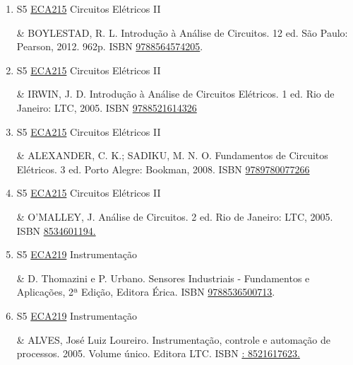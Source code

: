 \documentclass[12pt,a4paper]{book}
\begin{document}
\begin{enumerate}
 \item S5 \hyperref[PUD:ECA215]{ECA215} Circuitos Elétricos II

& BOYLESTAD, R.  L.  Introdução à Análise de Circuitos.  12 ed.  São Paulo: Pearson,
2012.  962p.  ISBN \href{http://www.bn.br/site/pages/servicosProfissionais/agenciaISBN/isbnBusca/FbnBuscaISBNCatalogo.asp?pField=ISBN&pIntPagina=1&pISBN=64574205&nidbISBN=true&hidbISBN=true}{9788564574205}.
 \item S5 \hyperref[PUD:ECA215]{ECA215} Circuitos Elétricos II

& IRWIN, J.  D.  Introdução à Análise de Circuitos Elétricos.  1 ed.  Rio de 
Janeiro: LTC, 2005.  ISBN \href{http://www.bn.br/site/pages/servicosProfissionais/agenciaISBN/isbnBusca/FbnBuscaISBNCatalogo.asp?pField=ISBN&pIntPagina=1&pISBN=21614326&nidbISBN=true&hidbISBN=true}{9788521614326} 
 

 \item S5 \hyperref[PUD:ECA215]{ECA215} Circuitos Elétricos II

& ALEXANDER, C.  K.;  SADIKU, M.  N.  O.  Fundamentos de Circuitos Elétricos.  
3 ed.  Porto Alegre: Bookman, 2008.  ISBN \href{http://www.google.com/search?hl=pt-BR&tbo=p&tbm=bks&q=isbn:9789780077266&num=10}{9789780077266}
 

 \item S5 \hyperref[PUD:ECA215]{ECA215} Circuitos Elétricos II

& O’MALLEY, J.  Análise de Circuitos.  2 ed.  Rio de Janeiro: LTC, 2005.  ISBN 
\href{http://www.google.com/search?hl=pt-BR&tbo=p&tbm=bks&q=isbn:8534601194.&num=10}{8534601194.}
 \item S5 \hyperref[PUD:ECA219]{ECA219} Instrumentação

& D.  Thomazini e P.  Urbano.  Sensores Industriais - Fundamentos e Aplicações, 2ª Edição, Editora Érica.  ISBN \href{http://www.bn.br/site/pages/servicosProfissionais/agenciaISBN/isbnBusca/FbnBuscaISBNCatalogo.asp?pField=ISBN&pIntPagina=1&pISBN=36500713&nidbISBN=true&hidbISBN=true}{9788536500713}. 

 

 \item S5 \hyperref[PUD:ECA219]{ECA219} Instrumentação

&  ALVES, José Luiz Loureiro.  Instrumentação, controle e automação de processos.  2005.  Volume único.  Editora LTC.  ISBN \href{http://www.google.com/search?hl=pt-BR&tbo=p&tbm=bks&q=isbn:: 8521617623.&num=10}{: 8521617623.} 

 


\end{enumerate}
\end{document}
